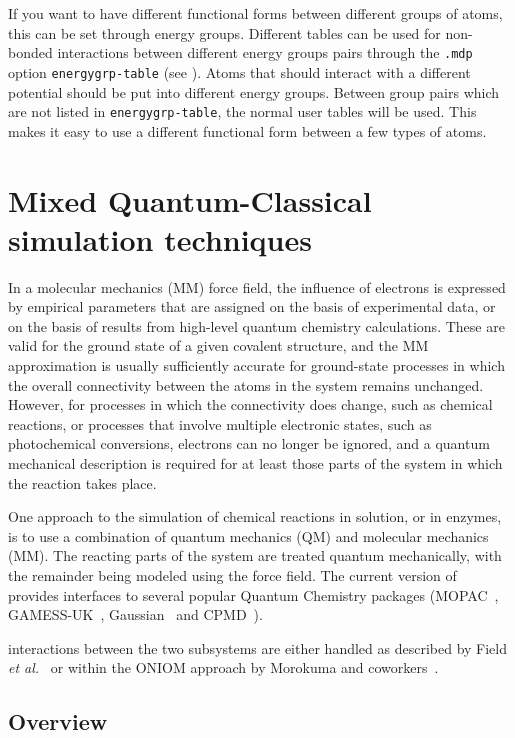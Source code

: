 If you want to have different functional forms between different
groups of atoms, this can be set through energy groups.
Different tables can be used for non-bonded interactions between
different energy groups pairs through the {\tt .mdp} option {\tt energygrp-table}
(see ).
Atoms that should interact with a different potential should
be put into different energy groups.
Between group pairs which are not listed in {\tt energygrp-table},
the normal user tables will be used. This makes it easy to use
a different functional form between a few types of atoms.

\section{Mixed Quantum-Classical simulation techniques}

In a molecular mechanics (MM) force field, the influence of electrons
is expressed by empirical parameters that are assigned on the basis of
experimental data, or on the basis of results from high-level quantum
chemistry calculations. These are valid for the ground state of a
given covalent structure, and the MM approximation is usually
sufficiently accurate for ground-state processes in which the overall
connectivity between the atoms in the system remains
unchanged. However, for processes in which the connectivity does
change, such as chemical reactions, or processes that involve multiple
electronic states, such as photochemical conversions, electrons can no
longer be ignored, and a quantum mechanical description is required
for at least those parts of the system in which the reaction takes
place.

One approach to the simulation of chemical reactions in solution, or
in enzymes, is to use a combination of quantum mechanics (QM) and
molecular mechanics (MM). The reacting parts of the system are treated
quantum mechanically, with the remainder being modeled using the
force field. The current version of {\gromacs} provides interfaces to
several popular Quantum Chemistry packages (MOPAC~\cite{mopac},
GAMESS-UK~\cite{gamess-uk}, Gaussian~\cite{g03} and CPMD~\cite{Car85a}).

{\gromacs} interactions between the two subsystems are
either handled as described by Field {\em et al.}~\cite{Field90a} or
within the ONIOM approach by Morokuma and coworkers~\cite{Maseras96a,
Svensson96a}.

\subsection{Overview}

